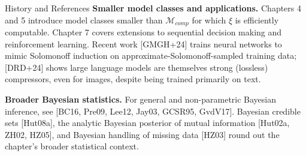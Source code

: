 \documentclass[aspectratio=169,10pt]{beamer}
\newcommand{\Mcal}{\mathcal{M}}
\begin{document}
\begin{frame}[allowframebreaks]{History and References}
  \vspace{2mm}
  \textbf{Smaller model classes and applications.} Chapters 4 and 5
  introduce model classes smaller than $\Mcal_{comp}$ for which $\xi$ is
  efficiently computable. Chapter 7 covers extensions to sequential decision
  making and reinforcement learning. Recent work [GMGH+24] trains neural
  networks to mimic Solomonoff induction on approximate-Solomonoff-sampled
  training data; [DRD+24] shows large language models are themselves
  strong (lossless) compressors, even for images, despite being trained
  primarily on text.

  \vspace{2mm}
  \textbf{Broader Bayesian statistics.} For general and non-parametric
  Bayesian inference, see [BC16, Pre09, Lee12, Jay03, GCSR95, GvdV17].
  Bayesian credible sets [Hut08a], the analytic Bayesian posterior of mutual
  information [Hut02a, ZH02, HZ05], and Bayesian handling of missing data
  [HZ03] round out the chapter's broader statistical context.
\end{frame}
\end{document}
